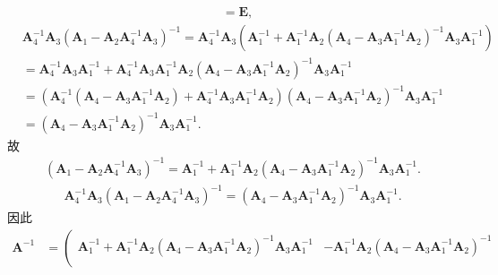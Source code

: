 \documentclass[../../main.tex]{subfiles}%
\begin{document}
\begin{solution}
\begin{align*}
\\
&=\boldsymbol{E},
\end{align*}
\begin{align*}
&\boldsymbol{A}_{4}^{-1}\boldsymbol{A}_3(\boldsymbol{A}_1-\boldsymbol{A}_2\boldsymbol{A}_{4}^{-1}\boldsymbol{A}_3)^{-1}=\boldsymbol{A}_{4}^{-1}\boldsymbol{A}_3\left( \boldsymbol{A}_{1}^{-1}+\boldsymbol{A}_{1}^{-1}\boldsymbol{A}_2\left( \boldsymbol{A}_4-\boldsymbol{A}_3\boldsymbol{A}_{1}^{-1}\boldsymbol{A}_2 \right) ^{-1}\boldsymbol{A}_3\boldsymbol{A}_{1}^{-1} \right) 
\\
&=\boldsymbol{A}_{4}^{-1}\boldsymbol{A}_3\boldsymbol{A}_{1}^{-1}+\boldsymbol{A}_{4}^{-1}\boldsymbol{A}_3\boldsymbol{A}_{1}^{-1}\boldsymbol{A}_2\left( \boldsymbol{A}_4-\boldsymbol{A}_3\boldsymbol{A}_{1}^{-1}\boldsymbol{A}_2 \right) ^{-1}\boldsymbol{A}_3\boldsymbol{A}_{1}^{-1}
\\
&=\left( \boldsymbol{A}_{4}^{-1}\left( \boldsymbol{A}_4-\boldsymbol{A}_3\boldsymbol{A}_{1}^{-1}\boldsymbol{A}_2 \right) +\boldsymbol{A}_{4}^{-1}\boldsymbol{A}_3\boldsymbol{A}_{1}^{-1}\boldsymbol{A}_2 \right) \left( \boldsymbol{A}_4-\boldsymbol{A}_3\boldsymbol{A}_{1}^{-1}\boldsymbol{A}_2 \right) ^{-1}\boldsymbol{A}_3\boldsymbol{A}_{1}^{-1}
\\
&=\left( \boldsymbol{A}_4-\boldsymbol{A}_3\boldsymbol{A}_{1}^{-1}\boldsymbol{A}_2 \right) ^{-1}\boldsymbol{A}_3\boldsymbol{A}_{1}^{-1}.
\end{align*}
故
\begin{align*}
\left( \boldsymbol{A}_1-\boldsymbol{A}_2\boldsymbol{A}_{4}^{-1}\boldsymbol{A}_3 \right) ^{-1}=\boldsymbol{A}_{1}^{-1}+\boldsymbol{A}_{1}^{-1}\boldsymbol{A}_2\left( \boldsymbol{A}_4-\boldsymbol{A}_3\boldsymbol{A}_{1}^{-1}\boldsymbol{A}_2 \right) ^{-1}\boldsymbol{A}_3\boldsymbol{A}_{1}^{-1}.
\end{align*}
\begin{align*}
\boldsymbol{A}_{4}^{-1}\boldsymbol{A}_3(\boldsymbol{A}_1-\boldsymbol{A}_2\boldsymbol{A}_{4}^{-1}\boldsymbol{A}_3)^{-1}=\left( \boldsymbol{A}_4-\boldsymbol{A}_3\boldsymbol{A}_{1}^{-1}\boldsymbol{A}_2 \right) ^{-1}\boldsymbol{A}_3\boldsymbol{A}_{1}^{-1}.
\end{align*}
因此
\begin{align*}
\boldsymbol{A}^{-1}&=\left( \begin{matrix}
\boldsymbol{A}_{1}^{-1}+\boldsymbol{A}_{1}^{-1}\boldsymbol{A}_2\left( \boldsymbol{A}_4-\boldsymbol{A}_3\boldsymbol{A}_{1}^{-1}\boldsymbol{A}_2 \right) ^{-1}\boldsymbol{A}_3\boldsymbol{A}_{1}^{-1}&		-\boldsymbol{A}_{1}^{-1}\boldsymbol{A}_2\left( \boldsymbol{A}_4-\boldsymbol{A}_3\boldsymbol{A}_{1}^{-1}\boldsymbol{A}_2 \right) ^{-1}\\

\end{matrix}
\end{align*}
\end{solution}
\end{document}
